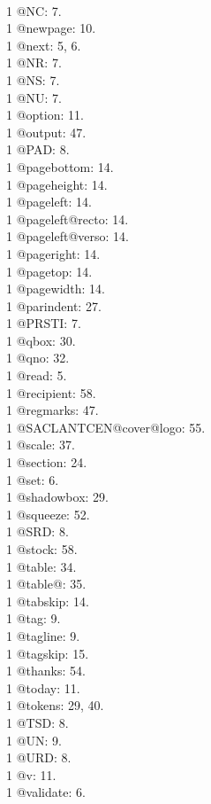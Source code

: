 \\1 @NC: 7.
\\1 @newpage: 10.
\\1 @next: 5, 6.
\\1 @NR: 7.
\\1 @NS: 7.
\\1 @NU: 7.
\\1 @option: 11.
\\1 @output: 47.
\\1 @PAD: 8.
\\1 @pagebottom: 14.
\\1 @pageheight: 14.
\\1 @pageleft: 14.
\\1 @pageleft@recto: 14.
\\1 @pageleft@verso: 14.
\\1 @pageright: 14.
\\1 @pagetop: 14.
\\1 @pagewidth: 14.
\\1 @parindent: 27.
\\1 @PRSTI: 7.
\\1 @qbox: 30.
\\1 @qno: 32.
\\1 @read: 5.
\\1 @recipient: 58.
\\1 @regmarks: 47.
\\1 @SACLANTCEN@cover@logo: 55.
\\1 @scale: 37.
\\1 @section: 24.
\\1 @set: 6.
\\1 @shadowbox: 29.
\\1 @squeeze: 52.
\\1 @SRD: 8.
\\1 @stock: 58.
\\1 @table: 34.
\\1 @table@: 35.
\\1 @tabskip: 14.
\\1 @tag: 9.
\\1 @tagline: 9.
\\1 @tagskip: 15.
\\1 @thanks: 54.
\\1 @today: 11.
\\1 @tokens: 29, 40.
\\1 @TSD: 8.
\\1 @UN: 9.
\\1 @URD: 8.
\\1 @v: 11.
\\1 @validate: 6.

